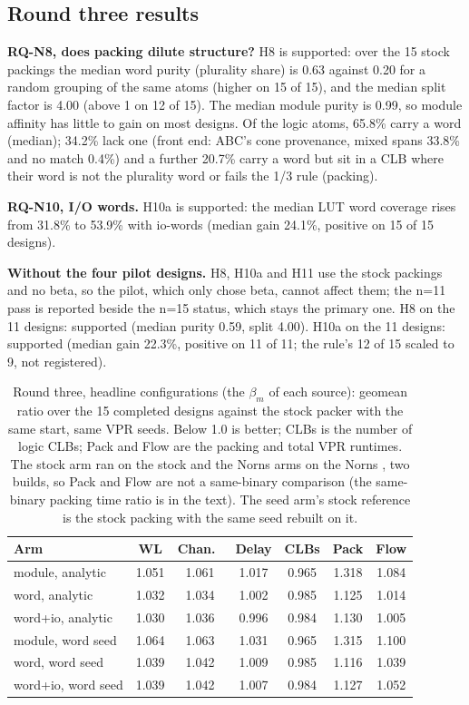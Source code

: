 \subsection{Round three results}
\label{sec:r3-results}

\textbf{RQ-N8, does packing dilute structure?} H8 is supported: over the 15 stock packings the median word purity
(plurality share) is 0.63 against 0.20 for a random grouping of the same atoms (higher on 15 of 15), and the median
split factor is 4.00 (above 1 on 12 of 15). The median module purity is 0.99, so module affinity has little to gain on most designs. Of the logic atoms, 65.8\% carry a word (median); 34.2\% lack one (front end: ABC's cone provenance, mixed
spans 33.8\% and no match 0.4\%) and a further 20.7\% carry a word but sit in a CLB where their word is not the
plurality word or fails the 1/3 rule (packing).

\textbf{RQ-N10, I/O words.} H10a is supported: the median LUT word coverage rises from 31.8\% to 53.9\% with io-words
(median gain 24.1\%, positive on 15 of 15 designs).

\textbf{Without the four pilot designs.} H8, H10a and H11 use the stock packings and no beta, so the pilot, which only chose
beta, cannot affect them; the n=11 pass is reported beside the n=15 status, which stays the primary one. H8 on the 11 designs: supported (median purity 0.59, split 4.00).
H10a on the 11 designs: supported (median gain 22.3\%, positive on 11 of 11; the rule's 12 of 15 scaled to 9, not registered).

\begin{table}[t]
\caption{Round three, headline configurations (the $\beta_m$ of each source): geomean ratio over the
15 completed designs against the stock packer with the same start, same VPR seeds. Below 1.0 is better;
CLBs is the number of logic CLBs; Pack and Flow are the packing and total VPR runtimes. The stock arm ran on the stock  and
the Norns arms on the Norns , two builds, so Pack and Flow are not a same-binary comparison (the same-binary packing time
ratio is in the text). The seed arm's stock reference is the stock
packing with the same  seed rebuilt on it.}
\label{tab:r3qor}
\centering
\footnotesize\setlength{\tabcolsep}{3pt}
\begin{tabular}{lcccccc}
\toprule
Arm & WL & Chan.\ & Delay & CLBs & Pack & Flow \\
\midrule
module, analytic & 1.051 & 1.061 & 1.017 & 0.965 & 1.318 & 1.084 \\
word, analytic & 1.032 & 1.034 & 1.002 & 0.985 & 1.125 & 1.014 \\
word+io, analytic & 1.030 & 1.036 & 0.996 & 0.984 & 1.130 & 1.005 \\
module, word seed & 1.064 & 1.063 & 1.031 & 0.965 & 1.315 & 1.100 \\
word, word seed & 1.039 & 1.042 & 1.009 & 0.985 & 1.116 & 1.039 \\
word+io, word seed & 1.039 & 1.042 & 1.007 & 0.984 & 1.127 & 1.052 \\
\bottomrule
\end{tabular}
\end{table}

